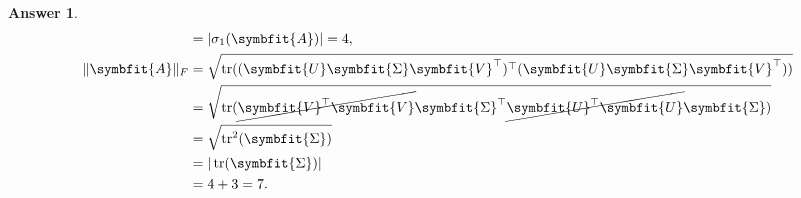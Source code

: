 \documentclass{article}
\theoremstyle{definition}
\newtheorem*{answer}{Answer}
\newcommand{\mat}[1]{\symbfit{#1}}
\begin{document}
\begin{enumerate}[leftmargin=\labelsep]
\begin{enumerate}
\begin{answer}
\begin{align*}
				                           & = |\sigma_1(\mat{A})| = 4,                                                                             \\
				            \|\mat{A}\|_F  & = \sqrt{\trace((\mat{U}\mat{\Sigma}\mat{V}^\top)^\top(\mat{U}\mat{\Sigma}\mat{V}^\top))}               \\
				                           & = \sqrt{\trace(\cancel{\mat{V}^\top\mat{V}}\mat{\Sigma}^\top\cancel{\mat{U}^\top\mat{U}}\mat{\Sigma})} \\
				                           & = \sqrt{\trace^2(\mat{\Sigma})}                                                                        \\
				                           & = |\trace(\mat{\Sigma})|                                                                               \\
				                           & = 4 + 3 = 7.
			            \end{align*}
		            \end{answer}


\end{enumerate}
\end{enumerate}
\end{document}
